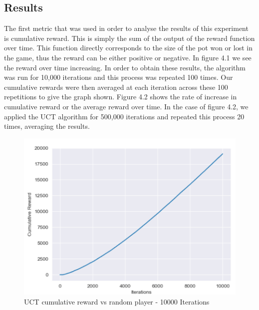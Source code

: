 \subsection{Results}\label{subsec:results1}
The first metric that was used in order to analyse the results of this experiment is cumulative reward.
This is simply the sum of the output of the reward function over time.
This function directly corresponds to the size of the pot won or lost in the game,
thus the reward can be either positive or negative.
In figure 4.1 we see the reward over time increasing.
In order to obtain these results, the algorithm was run for 10,000 iterations and this process was repeated 100 times.
Our cumulative rewards were then averaged at each iteration across these 100 repetitions to give the graph shown.
Figure 4.2 shows the rate of increase in cumulative reward or the average reward over time.
In the case of figure 4.2, we applied the UCT algorithm for 500,000 iterations and
repeated this process 20 times, averaging the results.

\begin{figure}[ht]
    \includegraphics[scale=.8]{images/cumulative_reward_mcts_vs_random.png}
    \caption{UCT cumulative reward vs random player - 10000 Iterations}
\end{figure}

